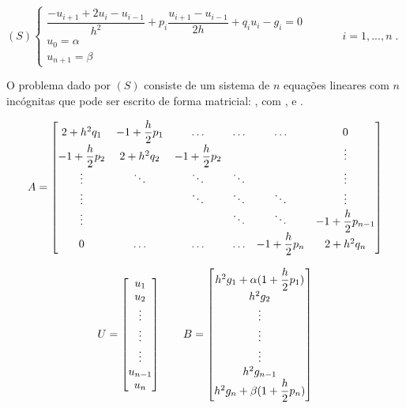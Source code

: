 \begin{center}
	\begin{math}
		(S)
		\left\{
    		\begin{array}{l}
      			\dfrac{-u_{i+1}+ 2u_i - u_{i-1}}{h^2} + p_i\dfrac{u_{i+1} - u_{i-1}}{2h}  + q_i u_i - g_i = 0 \\
				u_0 = \alpha\\
				u_{n+1} = \beta      			
    		\end{array}
    		\begin{array}{l}
      		\qquad \\
			\qquad \\
			\qquad	   
    		\end{array}
    		\begin{array}{l}
      			i = 1, ... , n \;.
    		\end{array}
		\right.
	\end{math}
\end{center} 

O problema dado por $(S)$ consiste de um sistema de $n$ equações lineares com $n$ incógnitas que pode ser escrito de forma matricial: , com ,  e .


\begin{equation*}
	\cmrtext{A} =
	\begin{bmatrix}
		2+h^2q_1 & -1+\dfrac{h}{2}p_1 & \ldots  & \ldots & \ldots & 0 \\
		-1+\dfrac{h}{2}p_2 & 2+h^2q_2 & -1+\dfrac{h}{2}p_2 &  & & \vdots\\
		\vdots &\ddots&\ddots&\ddots&& \vdots \\
		\vdots &&\ddots&\ddots&\ddots& \vdots \\
		\vdots & & & \ddots & \ddots & -1+\dfrac{h}{2}p_{n-1} \\
		0 & \ldots & \ldots & \ldots & -1+\dfrac{h}{2}p_n & 2+h^2q_n	
	\end{bmatrix}
\end{equation*}

\begin{equation*}
	\cmrtext{U} =
	\begin{bmatrix}
		u_1 \\
		u_2 \\
		\vdots \\
		\vdots \\
		\vdots \\
		u_{n-1} \\
		u_n
	\end{bmatrix}
	\qquad
	\cmrtext{B} =
	\begin{bmatrix}
		h^2g_1 + \alpha(1+\dfrac{h}{2}p_1) \\
		h^2g_2 \\
		\vdots \\
		\vdots \\
		\vdots \\
		h^2g_{n-1} \\
		h^2g_{n} + \beta(1+\dfrac{h}{2}p_n)
	\end{bmatrix}
\end{equation*}

